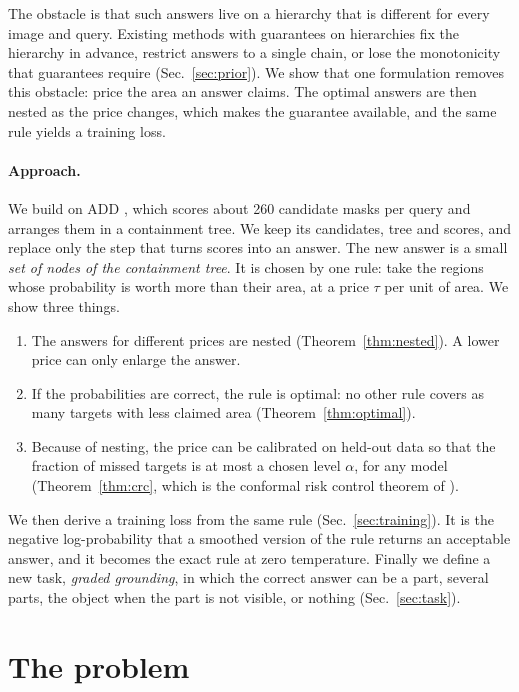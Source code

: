 \documentclass[11pt,a4paper]{article}
\theoremstyle{definition}
\theoremstyle{remark}
\begin{document}
The obstacle is that such answers live on a hierarchy that is different for every image and query. Existing
methods with guarantees on hierarchies fix the hierarchy in advance, restrict answers to a single chain, or lose
the monotonicity that guarantees require (Sec.~\ref{sec:prior}). We show that one formulation removes this
obstacle: price the area an answer claims. The optimal answers are then nested as the price changes, which makes
the guarantee available, and the same rule yields a training loss.

\paragraph{Approach.}
We build on ADD \cite{add}, which scores about 260 candidate masks per query and arranges them in a containment
tree. We keep its candidates, tree and scores, and replace only the step that turns scores into an answer. The new
answer is a small \emph{set of nodes of the containment tree}. It is chosen by one rule: take the regions whose
probability is worth more than their area, at a price $\tau$ per unit of area. We show three things.
\begin{enumerate}
\item The answers for different prices are nested (Theorem~\ref{thm:nested}). A lower price can only enlarge the
answer.
\item If the probabilities are correct, the rule is optimal: no other rule covers as many targets with less claimed
area (Theorem~\ref{thm:optimal}).
\item Because of nesting, the price can be calibrated on held-out data so that the fraction of missed targets is at
most a chosen level $\alpha$, for any model (Theorem~\ref{thm:crc}, which is the conformal risk control theorem of
\cite{crc}).
\end{enumerate}
We then derive a training loss from the same rule (Sec.~\ref{sec:training}). It is the negative log-probability that a
smoothed version of the rule returns an acceptable answer, and it becomes the exact rule at zero temperature.
Finally we define a new task, \emph{graded grounding}, in which the correct answer can be a part, several parts, the
object when the part is not visible, or nothing (Sec.~\ref{sec:task}).

\section{The problem}
\end{document}

